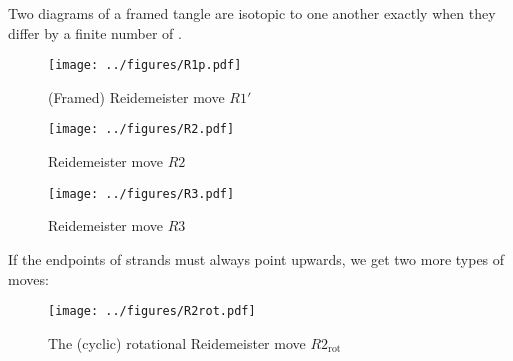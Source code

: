 \documentclass{beamer}
\theoremstyle{theorem}
\begin{document}
\begin{frame}
        \begin{theorem}[Reidemeister]
                Two diagrams of a framed tangle are isotopic to one another
                exactly when they differ by a finite number of
                .
        \end{theorem}
\end{frame}

\begin{frame}
        \begin{figure}
                \centering
                \texttt{[image: ../figures/R1p.pdf]}
                \caption{(Framed) Reidemeister move $R1'$}
                \label{fig:R1p}
        \end{figure}
\end{frame}

\begin{frame}
        \begin{figure}
                \centering
                \texttt{[image: ../figures/R2.pdf]}
                \caption{Reidemeister move $R2$}
                \label{fig:R2}
        \end{figure}
\end{frame}

\begin{frame}
        \begin{figure}
                \centering
                \texttt{[image: ../figures/R3.pdf]}
                \caption{Reidemeister move $R3$}
                \label{fig:R3}
        \end{figure}
\end{frame}

\begin{frame}
        If the endpoints of strands must always point upwards, we get two more types of
        moves:
        \pause
        \begin{figure}
                \centering
                \texttt{[image: ../figures/R2rot.pdf]}
                \caption{The (cyclic) rotational Reidemeister move $R2_{\text{rot}}$}
                \label{fig:R2rot}
        \end{figure}
\end{frame}
\end{document}

